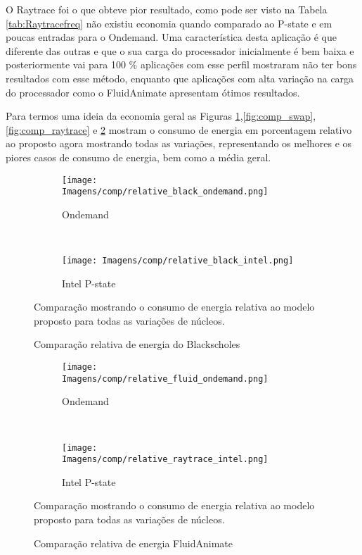 O Raytrace foi o que obteve pior resultado, como pode ser visto na Tabela \ref{tab:Raytracefreq} não existiu economia quando comparado ao P-state e em poucas entradas para o Ondemand. Uma característica desta aplicação é que diferente das outras e que o sua carga do processador inicialmente é bem baixa e posteriormente vai para 100 \% aplicações com esse perfil mostraram não ter bons resultados com esse método, enquanto que aplicações com alta variação na carga do processador como o FluidAnimate apresentam ótimos resultados.

Para termos uma ideia da economia geral as Figuras \ref{fig:comp_black},\ref{fig:comp_swap},\ref{fig:comp_raytrace} e \ref{fig:comp_fluid} mostram o consumo de energia em porcentagem relativo ao proposto agora mostrando todas as variações, representando os melhores e os piores casos de consumo de energia, bem como a média geral.

\begin{figure}[H]
	\centering
	\begin{subfigure}[t]{\textwidth}
		\centering
		\texttt{[image: Imagens/comp/relative\_black\_ondemand.png]}
		\caption{Ondemand}
	\end{subfigure}%
	\\
	\begin{subfigure}[t]{\textwidth}
		\centering
		\texttt{[image: Imagens/comp/relative\_black\_intel.png]}
		\caption{Intel P-state}
	\end{subfigure}%
	\caption{Comparação relativa de energia do Blackscholes}{Comparação mostrando o consumo de energia relativa ao modelo proposto para todas as variações de núcleos.}
	\label{fig:comp_black}
\end{figure}

\begin{figure}[H]
	\centering
	\begin{subfigure}[t]{\textwidth}
		\centering
		\texttt{[image: Imagens/comp/relative\_fluid\_ondemand.png]}
		\caption{Ondemand}
	\end{subfigure}%
	\\
	\begin{subfigure}[t]{\textwidth}
		\centering
		\texttt{[image: Imagens/comp/relative\_raytrace\_intel.png]}
		\caption{Intel P-state}
	\end{subfigure}%
	\caption{Comparação relativa de energia FluidAnimate}{Comparação mostrando o consumo de energia relativa ao modelo proposto para todas as variações de núcleos.}
	\label{fig:comp_fluid}
\end{figure}

